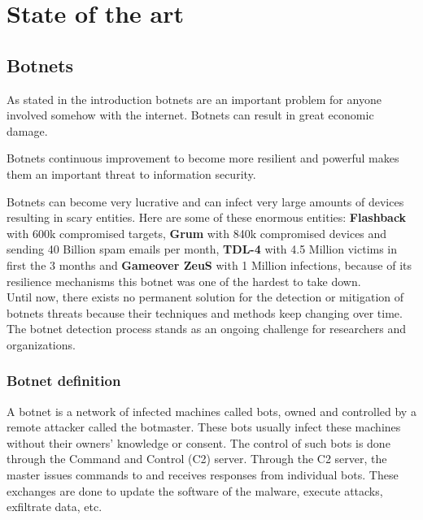
\chapter{State of the art}

\label{State of the art}

\section{Botnets}
As stated in the introduction botnets are an important problem for anyone involved somehow with the internet. Botnets can result in great economic damage. 

Botnets continuous improvement to become more resilient and powerful makes them an important threat to information security.

Botnets can become very lucrative and can infect very large amounts of devices resulting in scary entities.
Here are some of these enormous entities: \textbf{Flashback} with 600k compromised targets, \textbf{Grum} with 840k compromised devices and sending 40 Billion spam emails per month, \textbf{TDL-4} with 4.5 Million victims in first the 3 months and \textbf{Gameover ZeuS} with 1 Million infections, because of its resilience mechanisms this botnet was one of the hardest to take down.\\

Until now, there exists no permanent solution for the detection or mitigation of botnets threats because their techniques and methods keep changing over time. The botnet detection process stands as an ongoing challenge for researchers and organizations.

\subsection{Botnet definition}  
A botnet is a network of infected machines called bots, owned and controlled by a remote attacker called the botmaster. These bots usually infect these machines without their owners' knowledge or consent\cite{Botnet1}. The control of such bots is done through the Command and Control (C2) server. Through the C2 server, the master issues commands to and receives responses from individual bots. These exchanges are done to update the software of the malware, execute attacks, exfiltrate data, etc.

